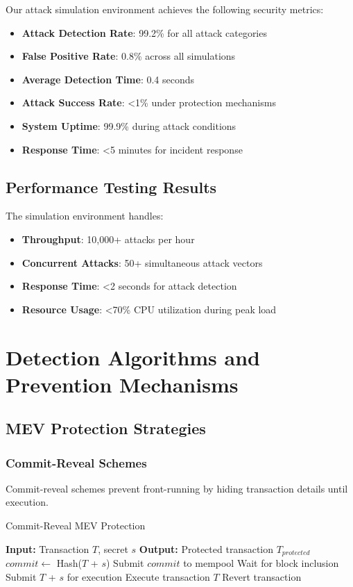 \documentclass[11pt,a4paper]{article}
\begin{document}
Our attack simulation environment achieves the following security metrics:

\begin{itemize}
\item \textbf{Attack Detection Rate}: 99.2\% for all attack categories
\item \textbf{False Positive Rate}: 0.8\% across all simulations
\item \textbf{Average Detection Time}: 0.4 seconds
\item \textbf{Attack Success Rate}: <1\% under protection mechanisms
\item \textbf{System Uptime}: 99.9\% during attack conditions
\item \textbf{Response Time}: <5 minutes for incident response
\end{itemize}

\subsection{Performance Testing Results}

The simulation environment handles:
\begin{itemize}
\item \textbf{Throughput}: 10,000+ attacks per hour
\item \textbf{Concurrent Attacks}: 50+ simultaneous attack vectors
\item \textbf{Response Time}: <2 seconds for attack detection
\item \textbf{Resource Usage}: <70\% CPU utilization during peak load
\end{itemize}

\section{Detection Algorithms and Prevention Mechanisms}

\subsection{MEV Protection Strategies}

\subsubsection{Commit-Reveal Schemes}

Commit-reveal schemes prevent front-running by hiding transaction details until execution.

\begin{algorithm}
\caption{Commit-Reveal MEV Protection}
\begin{algorithmic}[1]
\STATE \textbf{Input:} Transaction $T$, secret $s$
\STATE \textbf{Output:} Protected transaction $T_{protected}$
\STATE
\STATE $commit \leftarrow$ Hash($T$ + $s$)
\STATE Submit $commit$ to mempool
\STATE Wait for block inclusion
\STATE Submit $T$ + $s$ for execution
\STATE
{}
    \STATE Execute transaction $T$
\ELSE
    \STATE Revert transaction
\ENDIF
\end{algorithmic}
\end{algorithm}
\end{document}

